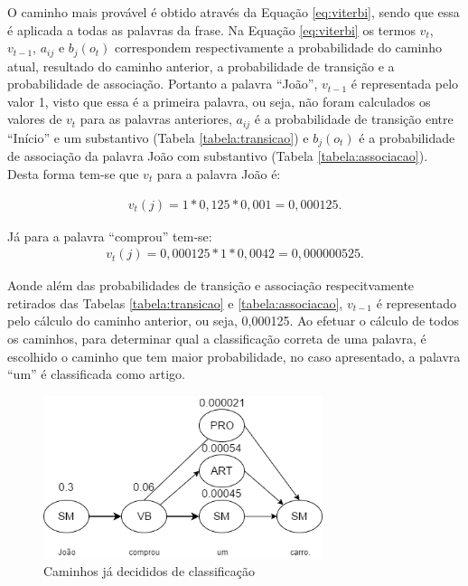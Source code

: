 O caminho mais provável é obtido através da Equação \ref{eq:viterbi}, sendo que
essa é aplicada a todas as palavras da frase. Na Equação \ref{eq:viterbi} os
termos $v_t$, $v_{t-1}$, $a_{ij}$ e $b_j(o_t)$ correspondem respectivamente a
probabilidade do caminho atual, resultado do caminho anterior, a probabilidade
de transição e a probabilidade de associação. 
Portanto a palavra ``João'', $v_{t-1}$ é representada pelo valor 1, visto
que essa é a primeira palavra, ou seja, não foram calculados os valores de
$v_t$ para as palavras anteriores, $a_{ij}$ é a probabilidade de transição entre
``Início'' e um substantivo (Tabela \ref{tabela:transicao}) e $b_j(o_t)$ é a
probabilidade de associação da palavra João com substantivo (Tabela
\ref{tabela:associacao}). Desta forma tem-se que $v_t$ para a palavra João é:

\begin{equation}
\begin{split}
v_t(j) = 1 * 0,125 * 0,001 = 0,000125.
\end{split}
\label{eq:joao}
\end{equation}

Já para a palavra ``comprou'' tem-se:
\begin{equation}
\begin{split}
v_t(j) = 0,000125 * 1 * 0,0042 = 0,000000525.
\end{split}
\label{eq:comprou}
\end{equation}

Aonde além das probabilidades de transição e associação respecitvamente
retirados das Tabelas \ref{tabela:transicao} e \ref{tabela:associacao}, $v_{t-1}$ é representado pelo cálculo do
caminho anterior, ou seja, 0,000125. Ao efetuar o cálculo de todos os caminhos,
para determinar qual a classificação correta de uma palavra, é escolhido o caminho que tem maior probabilidade, no
caso apresentado, a palavra ``um'' é classificada como artigo.

\begin{figure}[htbp]
\centering
\includegraphics[height=180px]{imagens/markov2.png}
\caption{Caminhos já decididos de classificação}
\label{fig:markov2}
\end{figure}

